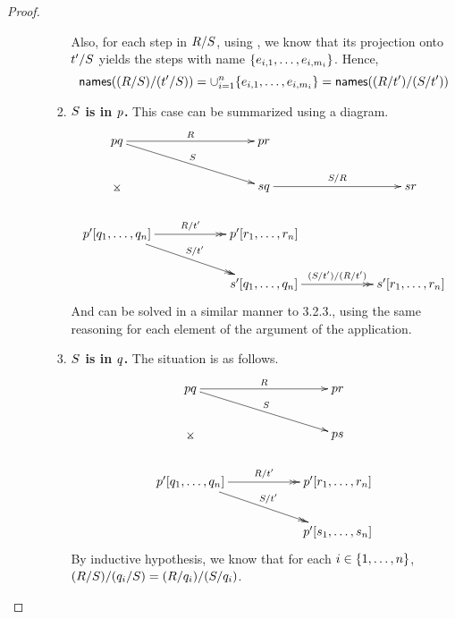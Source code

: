 \begin{proof}
\begin{enumerate}
\begin{enumerate}
\begin{enumerate}
            Also, for each step in $R / S$, using , we know that
            its projection onto $t' / S$ yields the steps with name $\{e_{i,1}, \hdots, e_{i, m_i}\}$.
            Hence,
              \[\mathsf{names}((R / S) / (t' / S)) = \cup_{i=1}^n \{e_{i,1}, \hdots, e_{i, m_i}\} = \mathsf{names}((R / t') / (S / t'))\]
          \item {\bf $S$ is in $p$.} This case can be summarized using a diagram.
            \[
            \xymatrix@C=2cm{
              \tmfive \tmsix
                \ar@{->}[r]^{\redex} \ar@{->}[rd]^{\redextwo} \ar@{}[dd]|*=0[@]{\rtimes}
                  & \tmfive \tmfour & \\
                & \tmtwo \tmsix
                  \ar@{->}[r]^{\redextwo / \redex}
                  & \tmtwo \tmfour \\
              \tmfive' [\tmsix_1, \hdots, \tmsix_n]
                \ar@{->>}[r]^{\redex / \tm'} \ar@{->>}[rd]^{\redextwo / \tm'}
                  & \tmfive' [\tmfour_1, \hdots, \tmfour_n] & \\
                  & \tmtwo' [\tmsix_1, \hdots, \tmsix_n]
                    \ar@{->>}[r]^{(\redextwo / \tm') / (\redex / \tm')}
                    & \tmtwo' [\tmfour_1, \hdots, \tmfour_n] \\
              }
            \]
            And can be solved in a similar manner to 3.2.3., using the same reasoning for each element
            of the argument of the application.
          \item {\bf $S$ is in $q$.} The situation is as follows.
            \[
            \xymatrix@C=2cm{
              \tmfive \tmsix
                \ar@{->}[r]^{\redex} \ar@{->}[rd]^{\redextwo} \ar@{}[dd]|*=0[@]{\rtimes}
                  & \tmfive \tmfour \\
                & \tmfive \tmtwo \\
              \tmfive' [\tmsix_1, \hdots, \tmsix_n]
                \ar@{->>}[r]^{\redex / \tm'} \ar@{->>}[rd]^{\redextwo / \tm'}
                  & \tmfive' [\tmfour_1, \hdots, \tmfour_n] \\
                  & \tmfive' [\tmtwo_1, \hdots, \tmtwo_n] \\
              }
            \]
            By inductive hypothesis, we know that for each $i \in \{1, \hdots, n\}$,
            $(R / S) / (q_i / S) = (R / q_i) / (S / q_i)$.


\end{enumerate}
\end{enumerate}
\end{enumerate}
\end{proof}
